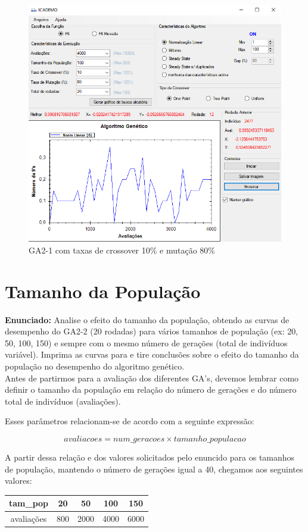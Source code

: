\documentclass[12pt]{article}
\begin{document}
\begin{figure}[H]
	\centering
	\includegraphics[width=0.7\linewidth]{Imagens/questao3}
	\caption{GA2-1 com taxas de crossover 10\% e mutação 80\%}
	\label{fig:questao3}
\end{figure}


\section{Tamanho da População}
\textbf{Enunciado:}
Analise o efeito do tamanho da população, obtendo as curvas de desempenho do GA2-2 (20 rodadas) para vários tamanhos de população (ex: 20, 50, 100, 150) e sempre com o mesmo número de gerações (total de indivíduos variável). Imprima as curvas para e tire conclusões sobre o efeito do tamanho da população no desempenho do
algoritmo genético.\\

Antes de partirmos para a avaliação dos diferentes GA's, devemos lembrar como definir o tamanho da população em relação do número de gerações e do número total de indivíduos (avaliações).

Esses parâmetros relacionam-se de acordo com a seguinte expressão:

\begin{equation*}
	avaliacoes=num\_geracoes\times tamanho\_populacao
\end{equation*}

A partir dessa relação e dos valores solicitados pelo enuncido para os tamanhos de população, mantendo o número de gerações igual a 40, chegamos aos seguintes valores:

\begin{table}[H]
	\centering
	\begin{tabular}{|c|c|c|c|c|}
		\hline
		tam\_pop & 20 & 50 & 100 & 150 \\
		\hline
		avaliações & 800 & 2000 & 4000 & 6000 \\
		\hline
	\end{tabular}
\end{table}
\end{document}
